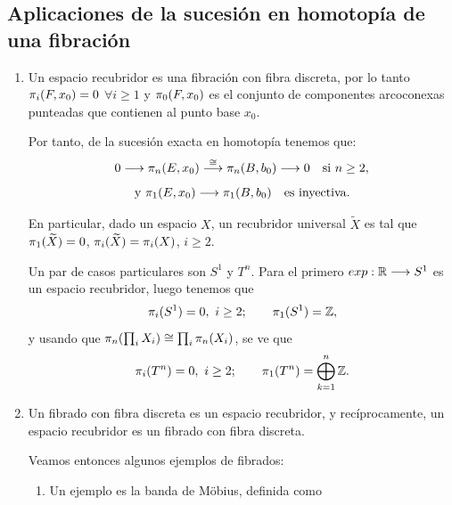 \subsection{Aplicaciones de la sucesión en homotopía de una fibración}
\begin{enumerate}
\item Un espacio recubridor es una fibración con fibra discreta, por lo tanto $\pi_{i}(F, x_0) = \nobreak 0$ $\forall i \geq  1$ y $\pi_{0}(F, x_0)$ es el conjunto de componentes arcoconexas punteadas que contienen al punto base $x_0$. \par
Por tanto, de la sucesión exacta en homotopía tenemos que:
\[
0 \longrightarrow \homot{n}{E, x_0} \stackrel{\cong}{\longrightarrow} \homot{n}{B, b_0} \longrightarrow 0 \quad \text{si } n \geq 2,
\]
\[
\text{y }\homot{1}{E, x_0} \longrightarrow \homot{1}{B, b_0} \quad \text{es inyectiva.}
\]

En particular, dado un espacio $X$, un recubridor universal $\widetilde{X}$ es tal que  $\pi_{1}(\widetilde{X}) = 0$, $\pi_{i}(\widetilde{X}) = \pi_{i}(X)$, $i \geq 2$. \par
Un par de casos particulares son $S^1$ y $T^n$. Para el primero $exp : \bb{R} \longrightarrow S^1$ es un espacio recubridor, luego tenemos que
\[
\pi_{i}(S^1) = 0, \ i \geq 2 ; \qquad \pi_{1}(S^1) = \mathbb{Z},
\]
y usando que $\pi_{n}(\prod_i X_i) \cong \prod_i \pi_{n}(X_i)$, se ve que 
\[
\pi_{i}(T^n) = 0, \ i \geq 2 ; \qquad \pi_{1}(T^n) = \bigoplus_{k = 1}^{n} \mathbb{Z}.
\]

\item Un fibrado con fibra discreta es un espacio recubridor, y recíprocamente, un espacio recubridor es un fibrado con fibra discreta. \par
Veamos entonces algunos ejemplos de fibrados:
\begin{enumerate}
\item Un ejemplo es la banda de Möbius, definida como 


\end{enumerate}
\end{enumerate}
